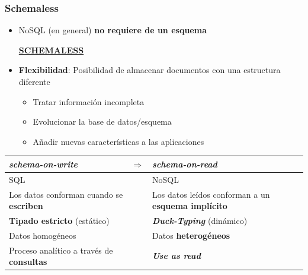 \documentclass[14pt]{beamer}
\begin{document}
\begin{frame}
  \frametitle{Schemaless}
\begin{itemize}
\item NoSQL (en general) {\bf no requiere de un esquema}
\begin{alertblock}{}
  \centering
  \href{https://farm6.staticflickr.com/5483/29931060254_109e3e36da_o_d.jpg}{\bf
    SCHEMALESS}
\end{alertblock}
\item {\bf Flexibilidad}: Posibilidad de almacenar documentos con una
  estructura diferente
\begin{itemize}
\item Tratar información incompleta
\item Evolucionar la base de datos/esquema
\item Añadir nuevas características a las aplicaciones
\end{itemize}
\end{itemize}

\framebreak

\begin{small}
\begin{tabular}{p{}cp{}}
{\bfseries\itshape schema-on-write}&$\Rightarrow$&{\bfseries\itshape
                                                   schema-on-read}\\
\midrule
\rowcolor{blue!20} SQL&&NoSQL\\
\rowcolor{blue!15} Los datos conforman cuando se {\bf escriben}&&Los datos leídos conforman a
                                               un {\bf esquema implícito}\\
\rowcolor{blue!20} {\bf Tipado estricto} (estático) && {\bfseries\itshape Duck-Typing}
                                    (dinámico) \\
\rowcolor{blue!15}  Datos homogéneos && Datos {\bf heterogéneos}\\
\rowcolor{blue!20} Proceso analítico a través de {\bf consultas} && {\bfseries\itshape Use as read}\\
\end{tabular}
\end{small}


\end{frame}
\end{document}
